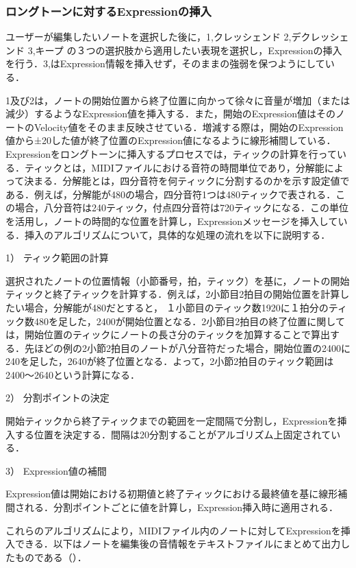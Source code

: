\subsubsection{ロングトーンに対するExpressionの挿入}
ユーザーが編集したいノートを選択した後に，1,クレッシェンド 2,デクレッシェンド 3,キープ の３つの選択肢から適用したい表現を選択し，Expressionの挿入を行う．3,はExpression情報を挿入せず，そのままの強弱を保つようにしている．

1及び2は，ノートの開始位置から終了位置に向かって徐々に音量が増加（または減少）するようなExpression値を挿入する．また，開始のExpression値はそのノートのVelocity値をそのまま反映させている．増減する際は，開始のExpression値から±20した値が終了位置のExpression値になるように線形補間している．Expressionをロングトーンに挿入するプロセスでは，ティックの計算を行っている．ティックとは，MIDIファイルにおける音符の時間単位であり，分解能によって決まる．分解能とは，四分音符を何ティックに分割するのかを示す設定値である．例えば，分解能が480の場合，四分音符1つは480ティックで表される．この場合，八分音符は240ティック，付点四分音符は720ティックになる．この単位を活用し，ノートの時間的な位置を計算し，Expressionメッセージを挿入している．挿入のアルゴリズムについて，具体的な処理の流れを以下に説明する．

1）	ティック範囲の計算

選択されたノートの位置情報（小節番号，拍，ティック）を基に，ノートの開始ティックと終了ティックを計算する．例えば，2小節目2拍目の開始位置を計算したい場合，分解能が480だとすると， １小節目のティック数1920に１拍分のティック数480を足した，2400が開始位置となる．2小節目2拍目の終了位置に関しては，開始位置のティックにノートの長さ分のティックを加算することで算出する．先ほどの例の2小節2拍目のノートが八分音符だった場合，開始位置の2400に240を足した，2640が終了位置となる．よって，2小節2拍目のティック範囲は2400～2640という計算になる．

2）	分割ポイントの決定

開始ティックから終了ティックまでの範囲を一定間隔で分割し，Expressionを挿入する位置を決定する．間隔は20分割することがアルゴリズム上固定されている．　 

3）	Expression値の補間

Expression値は開始における初期値と終了ティックにおける最終値を基に線形補間される．分割ポイントごとに値を計算し，Expression挿入時に適用される．

これらのアルゴリズムにより，MIDIファイル内のノートに対してExpressionを挿入できる．以下はノートを編集後の音情報をテキストファイルにまとめて出力したものである（）．

